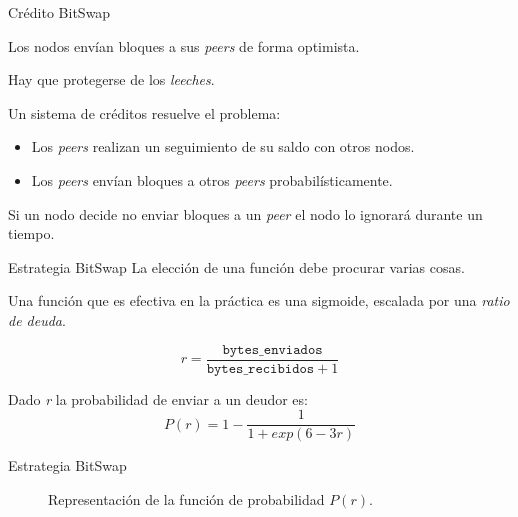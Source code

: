 \documentclass[spanish]{beamer}
\begin{document}
\begin{frame}{Crédito BitSwap}

  Los nodos envían bloques a sus \textit{peers} de forma optimista.

  Hay que protegerse de los \textit{leeches}.

  Un sistema de créditos resuelve el problema:
  \begin{itemize}
    \item Los \textit{peers} realizan un seguimiento de su saldo con otros nodos.
    \item Los \textit{peers} envían bloques a otros \textit{peers} probabilísticamente.
  \end{itemize}

  Si un nodo decide no enviar bloques a un \textit{peer} el nodo lo ignorará durante un tiempo.

\end{frame}

\begin{frame}{Estrategia BitSwap}
  La elección de una función debe procurar varias cosas.

  Una función que es efectiva en la práctica es una sigmoide, escalada por una \textit{ratio de deuda}.

  \begin{equation*}
    r = \frac{\texttt{bytes\_enviados}}{\texttt{bytes\_recibidos} + 1}
  \end{equation*}

  Dado \textit{r} la probabilidad de enviar a un deudor es:
  \begin{equation*}
    P(r) = 1 - \frac{1}{1 + exp(6-3r)}
  \end{equation*}
\end{frame}

\begin{frame}{Estrategia BitSwap}
  \begin{figure}
  \centering
  \caption{Representación de la función de probabilidad $P(r)$.}
\end{figure}
\end{frame}
\end{document}

